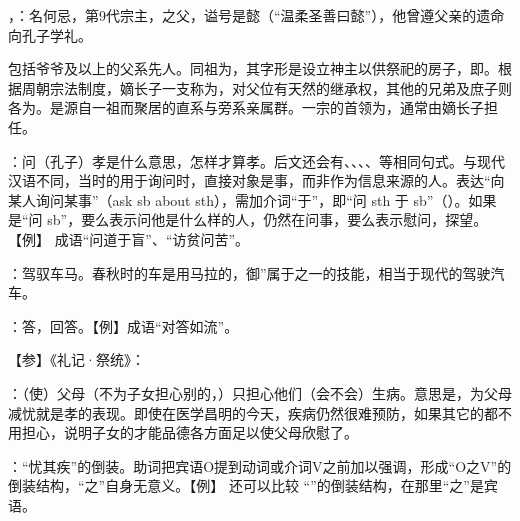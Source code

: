 {
\begin{lyitemize}
\item {}，：名何忌，第9代宗主，之父，谥号是懿（“温柔圣善曰懿”），他曾遵父亲的遗命向孔子学礼。%

包括爷爷及以上的父系先人。同祖为，其字形是设立神主以供祭祀的房子，即。根据周朝宗法制度，嫡长子一支称为，对父位有天然的继承权，其他的兄弟及庶子则各为。是源自一祖而聚居的直系与旁系亲属群。一宗的首领为，通常由嫡长子担任。

\item {}：问（孔子）孝是什么意思，怎样才算孝。后文还会有、、、、等相同句式。与现代汉语不同，当时的用于询问时，直接对象是事，而非作为信息来源的人。表达“向某人询问某事”（ask sb about sth），需加介词“于”，即“问 sth 于 sb”（）。如果是“问 sb”，要么表示问他是什么样的人，仍然在问事，要么表示慰问，探望。【例】    成语“问道于盲”、“访贫问苦”。
\item {}：驾驭车马。春秋时的车是用马拉的，御”属于之一的技能，相当于现代的驾驶汽车。
\item {}：答，回答。【例】成语“对答如流”。
\end{lyitemize}
【参】《礼记·祭统》：
}
{}


{
\item {}：（使）父母（不为子女担心别的，）只担心他们（会不会）生病。意思是，为父母减忧就是孝的表现。即使在医学昌明的今天，疾病仍然很难预防，如果其它的都不用担心，说明子女的才能品德各方面足以使父母欣慰了。

：“忧其疾”的倒装。助词把宾语O提到动词或介词V之前加以强调，形成“O之V”的倒装结构，“之”自身无意义。【例】     还可以比较  “”的倒装结构，在那里“之”是宾语。
}
{}


